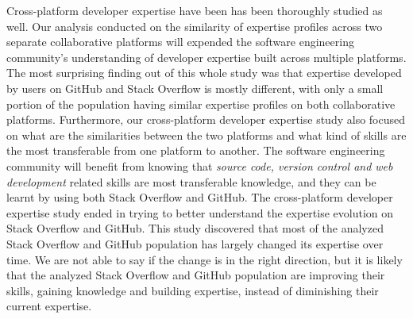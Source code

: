         Cross-platform developer expertise have been has been thoroughly studied as well. Our analysis conducted on the similarity of expertise profiles across two separate collaborative platforms will expended the software engineering community's understanding of developer expertise built across multiple platforms. The most surprising finding out of this whole study was that expertise developed by users on GitHub and Stack Overflow is mostly different, with only a small portion of the population having similar expertise profiles on both collaborative platforms. Furthermore, our cross-platform developer expertise study also focused on what are the similarities between the two platforms and what kind of skills are the most transferable from one platform to another. The software engineering community will benefit from knowing that \emph{source code, version control and web development} related skills are most transferable knowledge, and they can be learnt by using both Stack Overflow and GitHub. The cross-platform developer expertise study ended in trying to better understand the expertise evolution on Stack Overflow and GitHub. This study discovered that most of the analyzed Stack Overflow and GitHub population has largely changed its expertise over time. We are not able to say if the change is in the right direction, but it is likely that the analyzed Stack Overflow and GitHub population are improving their skills, gaining knowledge and building expertise, instead of diminishing their current expertise.
        
        
